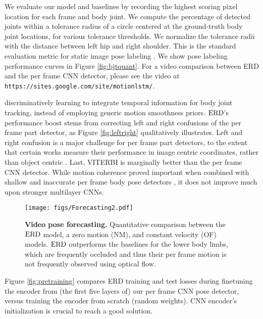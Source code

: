 \documentclass[10pt,twocolumn,letterpaper]{article}
\begin{document}
We evaluate our model and baselines by recording the highest scoring pixel location for each frame and  body joint. We compute the percentage of detected joints within a tolerance radius of a circle centered at the ground-truth body joint locations, for various  tolerance thresholds. We normalize the tolerance radii with the distance between left hip and right shoulder. This is the standard evaluation metric for static image pose labeling \cite{MODEC}. We show pose labeling performance curves  in Figure \ref{fig:bjtquant}. For a video comparison between ERD and the per frame CNN detector, please see the video at { \tt https://sites.google.com/site/motionlstm/}.




discriminatively learning to integrate temporal information  for body joint tracking, instead of employing generic motion smoothness priors.  $\text{ERD}$'s performance boost stems from correcting left and right confusions of the per frame part detector, as Figure \ref{fig:leftright} qualitatively illustrates.  
Left and right confusion is a major challenge for per frame part detectors, to the extent that certain works measure their performance in image centric coordinates, rather than object centric 
\cite{YangR_CVPR_2011,MODEC}. Last, VITERBI is marginally better than the per frame CNN detector. While motion coherence proved important when combined with shallow and inaccurate per frame body pose detectors \cite{DBLP:conf/iccv/ParkR11,Batra:2012:DMS:2403138.2403140}, it does not improve much upon stronger  multilayer CNNs.


\begin{figure*}[ht]
\begin{center}
\texttt{[image: figs/Forecasting2.pdf]}
\end{center}
\caption{ \textbf{Video pose forecasting.} Quantitative comparison between the $\text{ERD}$ model, a zero motion (NM), and constant velocity (OF) models. $\text{ERD}$ outperforms the baselines for the lower body limbs, which are frequently occluded and thus their per frame motion is not frequently observed using optical flow. }
\label{fig:forecasting}
\end{figure*}


Figure \ref{fig:pretraining} compares ERD training and test losses during finetuning  the encoder from (the first five layers of) our  per frame CNN pose detector, versus training the encoder from scratch (random weights). CNN encoder's  initialization is crucial to reach a good solution.  
\end{document}
